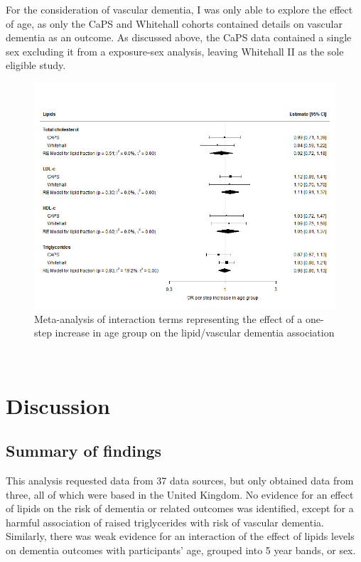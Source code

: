 \documentclass[a4paper, twoside]{templates/ociamthesis}
\begin{document}
For the consideration of vascular dementia, I was only able to explore the effect of age, as only the CaPS and Whitehall cohorts contained details on vascular dementia as an outcome. As discussed above, the CaPS data contained a single sex excluding it from a exposure-sex analysis, leaving Whitehall II as the sole eligible study.





\begin{figure}[H]
\includegraphics[width=1\linewidth]{figures/ipd/interaction_age_vasdem} \caption[shortcap]{Meta-analysis of interaction terms representing the effect of a one-step increase in age group on the lipid/vascular dementia association}\label{fig:interactionVascularAge}
\end{figure}

~

\hypertarget{discussion-3}{%
\section{Discussion}\label{discussion-3}}

\hypertarget{summary-of-findings-2}{%
\subsection{Summary of findings}\label{summary-of-findings-2}}

This analysis requested data from 37 data sources, but only obtained data from three, all of which were based in the United Kingdom. No evidence for an effect of lipids on the risk of dementia or related outcomes was identified, except for a harmful association of raised triglycerides with risk of vascular dementia. Similarly, there was weak evidence for an interaction of the effect of lipids levels on dementia outcomes with participants' age, grouped into 5 year bands, or sex.
\end{document}
